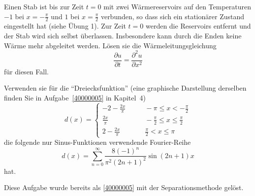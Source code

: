 Einen Stab ist bis zur Zeit $t=0$ mit zwei
Wärmereservoirs auf den Temperaturen $-1$ bei $x=-\frac{\pi}2$ und
$1$ bei $x=\frac{\pi}2$ verbunden,
so dass sich ein stationärer Zustand eingestellt hat (siehe
Übung 1). Zur Zeit $t=0$ werden die Reservoirs entfernt und der
Stab wird sich selbst überlassen. Insbesondere kann durch die
Enden keine Wärme mehr abgeleitet werden. Lösen sie die
Wärmeleitungsgleichung
\[
\frac{\partial u}{\partial t}=\frac{\partial^2 u}{\partial x^2}
\]
für diesen Fall.

\begin{hinweis}
Verwenden sie für die
``Dreiecksfunktion''
(eine graphische Darstellung derselben finden Sie in Aufgabe~\ref{40000005}
in Kapitel~4)
\[
d(x)
=
\begin{cases}
\displaystyle-2-\frac{2x}{\pi}&\qquad \displaystyle-\pi\le x <-\frac{\pi}2\\
\displaystyle\frac{2x}{\pi}&\qquad \displaystyle-\frac{\pi}2\le x\le \frac{\pi}2\\
\displaystyle2-\frac{2x}{\pi}&\qquad \displaystyle \frac{\pi}2<x\le \pi
\end{cases}
\]
die folgende nur Sinus-Funktionen
verwendende Fourier-Reihe
\[
d(x)=\sum_{n=0}^\infty \frac{8(-1)^n}{\pi^2(2n+1)^2}\sin (2n+1)x
\]
hat.
\end{hinweis}

\begin{hinweis}
Diese Aufgabe wurde bereits als \ref{40000005} mit der Separationsmethode
gelöst.
\end{hinweis}

